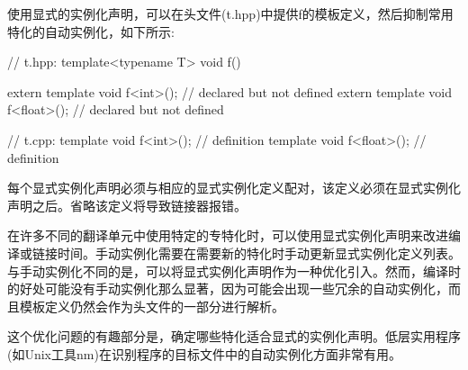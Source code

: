 使用显式的实例化声明，可以在头文件(t.hpp)中提供f的模板定义，然后抑制常用特化的自动实例化，如下所示:

\begin{cpp}
// t.hpp:
template<typename T> void f()
{ }

extern template void f<int>(); // declared but not defined
extern template void f<float>(); // declared but not defined

// t.cpp:
template void f<int>(); // definition
template void f<float>(); // definition
\end{cpp}

每个显式实例化声明必须与相应的显式实例化定义配对，该定义必须在显式实例化声明之后。省略该定义将导致链接器报错。

在许多不同的翻译单元中使用特定的专特化时，可以使用显式实例化声明来改进编译或链接时间。手动实例化需要在需要新的特化时手动更新显式实例化定义列表。与手动实例化不同的是，可以将显式实例化声明作为一种优化引入。然而，编译时的好处可能没有手动实例化那么显著，因为可能会出现一些冗余的自动实例化，而且模板定义仍然会作为头文件的一部分进行解析。

\begin{notice}
这个优化问题的有趣部分是，确定哪些特化适合显式的实例化声明。低层实用程序(如Unix工具nm)在识别程序的目标文件中的自动实例化方面非常有用。
\end{notice}

















